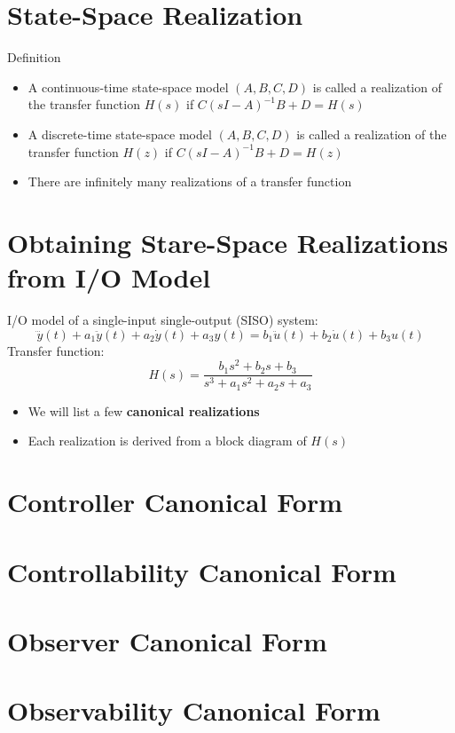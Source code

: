 \documentclass[10pt,a4paper,oneside]{article}
\begin{document}
\section{State-Space Realization}
Definition
\begin{itemize}
\item A continuous-time state-space model $(A,B,C,D)$ is called a realization of the transfer function $H(s)$ if $C(sI-A)^{-1}B+D=H(s)$
\item A discrete-time state-space model $(A,B,C,D)$ is called a realization of the transfer function $H(z)$ if $C(sI-A)^{-1}B+D=H(z)$
\item There are infinitely many realizations of a transfer function
\end{itemize}
\section{Obtaining Stare-Space Realizations from I/O Model}
I/O model of a single-input single-output (SISO) system:
\[
\dddot{y}(t)+a_{1} \ddot{y}(t)+a_{2} \dot{y}(t)+a_{3} y(t)=b_{1} \ddot{u}(t)+b_{2} \dot{u}(t)+b_{3} u(t)
\]
Transfer function:
\[
H(s)=\frac{b_{1} s^{2}+b_{2} s+b_{3}}{s^{3}+a_{1} s^{2}+a_{2} s+a_{3}}
\]
\begin{itemize}
\item We will list a few {\bfseries canonical realizations}
\item Each realization is derived from a block diagram of $H(s)$
\end{itemize}
\section{Controller Canonical Form}
\section{Controllability Canonical Form}
\section{Observer Canonical Form}
\section{Observability Canonical Form}
\end{document}
